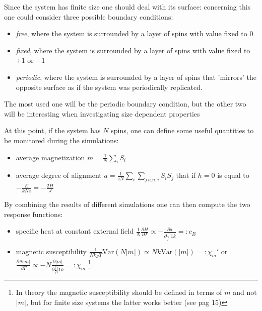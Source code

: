 \documentclass[a4paper, 11pt]{article}
\begin{document}
    Since the system has finite size one should deal with its surface: concerning this one could consider three possible boundary conditions:
    \begin{itemize}
      \item \emph{free}, where the system is surrounded by a layer of spins with value fixed to $0$
      \item \emph{fixed}, where the system is surrounded by a layer of spins with value fixed to $+1$ or $-1$
      \item \emph{periodic}, where the system is surrounded by a layer of spins that 'mirrors' the opposite surface as if the system was periodically replicated.
    \end{itemize}
    The most used one will be the periodic boundary condition, but the other two will be interesting when investigating size dependent properties

    At this point, if the system has $N$ spins, one can define some useful quantities to be monitored during the simulations:
    \begin{itemize}
      \item average magnetization $m = \frac{1}{N} \sum_i S_i$
      \item average degree of alignment $a = \frac{1}{zN} \sum_i \sum_{j \, n.n. \, i} S_i S_j$ that if $h = 0$ is equal to $-\frac{E}{kNz} = -\frac{2H}{J}$
    \end{itemize}

    By combining the results of different simulations one can then compute the two response functions:
    \begin{itemize}
      \item specific heat at constant external field $\frac{1}{N} \frac{\partial H}{\partial T} \propto -\frac{\partial a}{\partial \frac[f]{1}{k}} =: c_B$
      \item magnetic susceptibility $\frac{1}{Nk_BT} \text{Var}(N|m|) \propto Nk\text{Var}(|m|) =: \chi_m'$ or $\frac{\partial N|m|}{\partial T} \propto -N\frac{\partial |m|}{\partial \frac[f]{1}{k}} =: \chi_m$ \footnote{In theory the magnetic susceptibility should be defined in terms of $m$ and not $|m|$, but for finite size systems the latter works better (see \cite{rif:eye-opener} pag 15)}.
    \end{itemize}    
\end{document}
